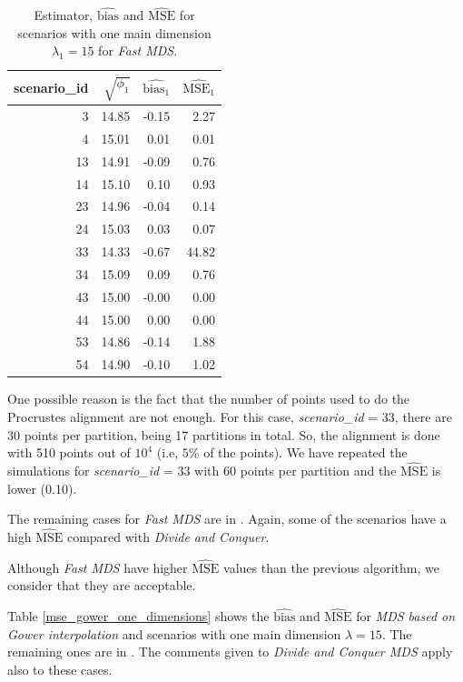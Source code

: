 \documentclass[11pt]{report}
\begin{document}
\begin{table}[ht]
\centering
\begin{tabular}{rrrr}
 scenario\_id & $\overline{\sqrt{\phi_1}}$ & $\widehat{\mbox{bias}_1}$ & $\widehat{\mbox{MSE}_1}$ \\
  \hline
  3 & 14.85 & -0.15 & 2.27 \\ 
  4 & 15.01 & 0.01 & 0.01 \\ 
  13 & 14.91 & -0.09 & 0.76 \\ 
  14 & 15.10 & 0.10 & 0.93 \\ 
  23 & 14.96 & -0.04 & 0.14 \\ 
  24 & 15.03 & 0.03 & 0.07 \\ 
  33 & 14.33 & -0.67 & 44.82 \\ 
  34 & 15.09 & 0.09 & 0.76 \\ 
  43 & 15.00 & -0.00 & 0.00 \\ 
  44 & 15.00 & 0.00 & 0.00 \\ 
  53 & 14.86 & -0.14 & 1.88 \\ 
  54 & 14.90 & -0.10 & 1.02 \\ 
   \hline
\end{tabular}
\caption{Estimator, $\widehat{\mbox{bias}}$ and $\widehat{\mbox{MSE}}$ for scenarios with one main dimension $\lambda_1 = 15$ for \textit{Fast MDS}.}
\label{mse_fast_one_dimensions}
\end{table}


\indent One possible reason is the fact that the number of points used to do the 
Procrustes alignment are not enough. For this case, \textit{scenario\_id} = 33,
there are  30 points per partition, being 17 partitions in total. So, 
the alignment is done with 510 points out of $10^4$ (i.e, $5\%$ of the points). 
We have repeated the simulations for \textit{scenario\_id} = 33 with 60 
points per partition and the $\widehat{\mbox{MSE}}$ is lower (0.10). 

\indent The remaining cases for \textit{Fast MDS} are in . Again,
some of the scenarios have a high $\widehat{\mbox{MSE}}$ compared with
\textit{Divide and Conquer}.

\indent Although \textit{Fast MDS} have higher $\widehat{\mbox{MSE}}$ values 
than the previous algorithm, we consider that they are acceptable. 

\indent Table \ref{mse_gower_one_dimensions} shows the $\widehat{\mbox{bias}}$ 
and $\widehat{\mbox{MSE}}$ for \textit{MDS based on Gower interpolation} 
and scenarios with one main dimension $\lambda = 15$. The remaining ones are in
. The comments given to \textit{Divide and Conquer MDS} apply 
also to these cases. 
\end{document}
